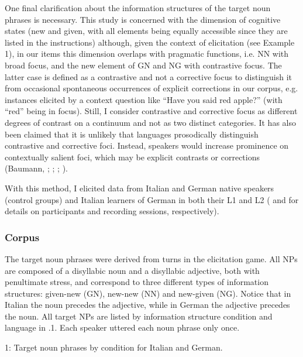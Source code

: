 One final clarification about the information structures of the target noun phrases is necessary. This study is concerned with the dimension of cognitive states (new and given, with all elements being equally accessible since they are listed in the instructions) although, given the context of elicitation (see Example 1), in our items this dimension overlaps with pragmatic functions, i.e. NN with broad focus, and the new element of GN and NG with contrastive focus. The latter case is defined as a contrastive and not a corrective focus to distinguish it from occasional spontaneous occurrences of explicit corrections in our corpus, e.g. instances elicited by a context question like “Have you said red apple?” (with “red” being in focus). Still, I consider contrastive and corrective focus as different degrees of contrast on a continuum and not as two distinct categories. It has also been claimed that it is unlikely that languages prosodically distinguish contrastive and corrective foci. Instead, speakers would increase prominence on contextually salient foci, which may be explicit contrasts or corrections (Baumann, \citealt{GriceSteindamm2006b}; \citealt{Calhoun2009}; \citealt{Féry2013}; \citealt{KüglerCalhoun2020}).

With this method, I elicited data from Italian and German native speakers (control groups) and Italian learners of German in both their L1 and L2 ( and  for details on participants and recording sessions, respectively).

\subsubsection{Corpus}
\hypertarget{Toc191305893}{}
The target noun phrases were derived from turns in the elicitation game. All NPs are composed of a disyllabic noun and a disyllabic adjective, both with penultimate stress, and correspond to three different types of information structures: given-new (GN), new-new (NN) and new-given (NG). Notice that in Italian the noun precedes the adjective, while in German the adjective precedes the noun. All target NPs are listed by information structure condition and language in .1. Each speaker uttered each noun phrase only once.

\begin{stylelsTableHeading}%
\begin{table}
\caption{1: Target noun phrases by condition for Italian and German.}
\label{tab:key:4}
\end{table}\end{stylelsTableHeading}


